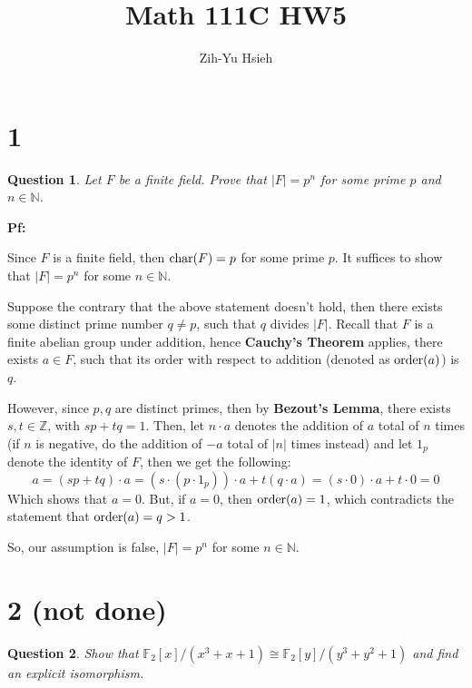 \documentclass{article}
\title{Math 111C HW5}
\author{Zih-Yu Hsieh}
\newtheorem{question}{Question}
\begin{document}
\maketitle

\section*{1}
\begin{myBox}[]{}
    \begin{question}
        Let $F$ be a finite field. Prove that $|F|=p^n$ for some prime $p$ and $n\in\mathbb{N}$.
    \end{question}
\end{myBox}

\textbf{Pf:}

Since $F$ is a finite field, then $\textmd{char}(F)=p$ for some prime $p$. It suffices to show that $|F|=p^n$ for some $n\in\mathbb{N}$.

Suppose the contrary that the above statement doesn't hold, then there exists some distinct prime number $q\neq p$, such that $q$ divides $|F|$. Recall that $F$ is a finite abelian group under addition, hence \textbf{Cauchy's Theorem} applies, there exists $a\in F$, such that its order with respect to addition (denoted as $\textmd{order}(a)$) is $q$.

However, since $p,q$ are distinct primes, then by \textbf{Bezout's Lemma}, there exists $s,t\in\mathbb{Z}$, with $sp+tq = 1$. Then, let $n\cdot a$ denotes the addition of $a$ total of $n$ times (if $n$ is negative, do the addition of $-a$ total of $|n|$ times instead) and let $1_p$ denote the identity of $F$, then we get the following:
$$a = (sp+tq)\cdot a = (s\cdot (p\cdot 1_p))\cdot a + t(q\cdot a) = (s\cdot 0)\cdot a + t\cdot 0 = 0$$
Which shows that $a=0$. But, if $a=0$, then $\textmd{order}(a)=1$, which contradicts the statement that $\textmd{order}(a)=q>1$. 

So, our assumption is false, $|F|=p^n$ for some $n\in\mathbb{N}$.

\break

\section*{2 (not done)}
\begin{myBox}[]{}
    \begin{question}
        Show that $\mathbb{F}_2[x]/(x^3+x+1)\cong \mathbb{F}_2[y]/(y^3+y^2+1)$ and find an explicit isomorphism.
    \end{question}
\end{myBox}
\end{document}
